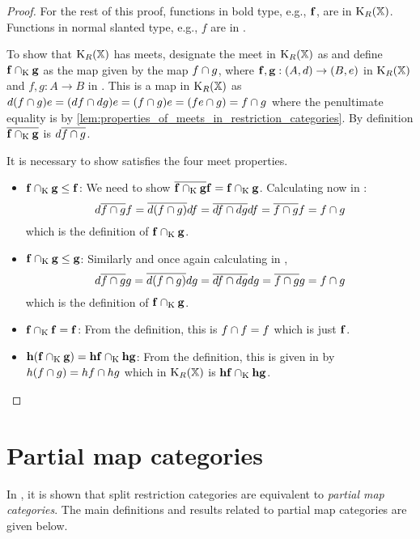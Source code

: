 \begin{proof}
  For the rest of this proof, functions in bold type, e.g., $\mathbf{f}$, are in $\text{K}_{R}(\mathbb{X})$.
  Functions in normal slanted type, e.g., $f$ are in \X.

  To show that $\text{K}_{R}(\mathbb{X})$ has meets,  designate the meet in $\text{K}_{R}(\mathbb{X})$ as \meetspl
  and define $\mathbf{f} \cap_{\text{K}} \mathbf{g}$ as the map given by the \X map $f \cap g$, where
  $\mathbf{f},\mathbf{g}:(A,d)\to(B,e)$ in $\text{K}_{R}(\mathbb{X})$ and $f,g:A\to B$ in \X . This is
  a map in $\text{K}_{R}(\mathbb{X})$ as
  $d(f \cap g)e = (d\hspace{0.1pt} f \cap d\hspace{0.1pt} g) e = (f \cap g) e = (f e \cap g) = f\cap g$
  where the penultimate equality is by
  \ref{lem:properties_of_meets_in_restriction_categories}.
  By definition $\overline{\mathbf{f} \cap_{\text{K}} \mathbf{g} }$ is $d\overline{f\cap g}$.

  It is necessary to show \meetspl satisfies the four meet properties.
  \begin{itemize}
    \item{$\mathbf{f}\cap_{\text{K}} \mathbf{g} \le \mathbf{f}$: } We need to show
      $\overline{\mathbf{f} \cap_{\text{K}} \mathbf{g}} \mathbf{f} =  \mathbf{f} \cap_{\text{K}} \mathbf{g}$.  Calculating now in \X:
      \[
        d \overline{f \cap g} f= \overline{d(f\cap g)} d f  = \overline{d f \cap d g} d f
         = \overline{f \cap g} f  = f \cap g
      \]
      which is the definition of $\mathbf{f} \cap_{\text{K}} \mathbf{g}$.
    \item{$\mathbf{f}\cap_{\text{K}} \mathbf{g} \le \mathbf{g}$: } Similarly and once again calculating in \X,
      \[
        d \overline{f \cap g} g = \overline{d(f\cap g)} d g  = \overline{d f \cap d g} d g
         = \overline{f \cap g} g  = f \cap g
      \]
      which is the definition of $\mathbf{f} \cap_{\text{K}} \mathbf{g}$.
    \item{$\mathbf{f}\cap_{\text{K}} \mathbf{f} = \mathbf{f}$: } From the definition, this is $f \cap f = f$ which
      is just $ \mathbf{f}$.
    \item{$\mathbf{h}(\mathbf{f}\cap_{\text{K}} \mathbf{g}) = \mathbf{h}\mathbf{f} \cap_{\text{K}} \mathbf{h}\mathbf{g}$: }
      From the definition, this is given in \X by $ h (f \cap g) =
      h f \cap h g$ which in $\text{K}_{R}(\mathbb{X})$ is $\mathbf{h}\mathbf{f} \cap_{\text{K}} \mathbf{h}\mathbf{g}$.
  \end{itemize}
\end{proof}



\section{Partial map categories} %
\label{sub:partial_map_categories}

In \cite{cockett2002:restcategories1}, it is shown that split restriction categories are
equivalent to \emph{partial map categories}. The main definitions and results related to
partial map categories are given below.

